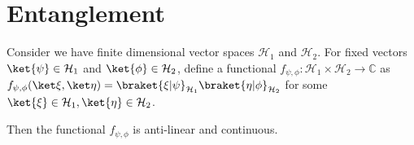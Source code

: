\pagebreak
\section{Entanglement}

\begin{comment}
x notation for tensor product of vectors
x Simple notation
x properties of tensor product of vectors
* orthonormal basis for tensor product space
* Inner product defined on space of tensor products of vectors
* Definition of tensor product of spaces -- Hilbert space
* Notation for tensor product of spaces
* Tensor product multiplication rules
* Principle of Entanglement
* Proof that most states are entangled
\end{comment}


\begin{prop}
    Consider we have finite dimensional vector spaces $\mathcal{H}_1$ and $\mathcal{H}_2$. For fixed vectors $\ket{\psi} \in \mathcal{H}_1$ and $\ket{\phi} \in \mathcal{H}_2$, define a functional $f_{\psi,\phi}: \mathcal{H}_1 \times \mathcal{H}_2 \to \mathbb{C}$ as $f_{\psi,\phi}(\ket\xi, \ket\eta) = \braket{\xi|\psi}_{\mathcal{H}_1} \braket{\eta | \phi}_{\mathcal{H}_2}$ for some $\ket{\xi} \in \mathcal{H}_1, \ket{\eta} \in \mathcal{H}_2$.

    Then the functional $f_{\psi,\phi}$ is anti-linear and continuous.
\end{prop}
